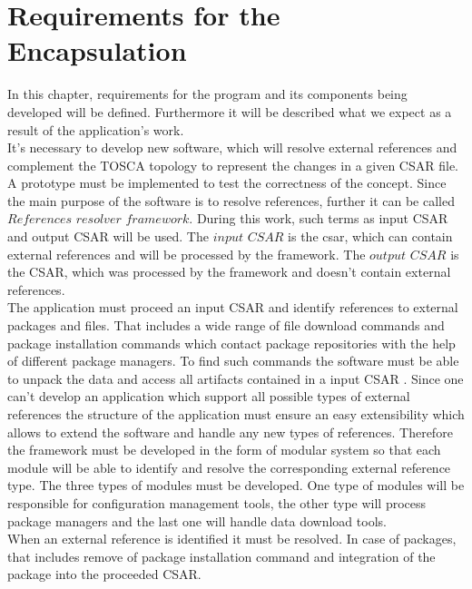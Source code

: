
\chapter{Requirements for the Encapsulation}\label{chap:req}
In this chapter, requirements for the program and its components being developed will be defined.
Furthermore it will be described what we expect as a result of the application's work.\\
It's necessary to develop new software, which will resolve external references and complement the TOSCA topology to represent the changes in a given CSAR file.
A prototype must be implemented to test the correctness of the concept.
Since the main purpose of the software is to resolve references, further it can be called $References$ $resolver$ $framework$.  
During this work, such terms as input CSAR and output CSAR will be used.
The $input$ $CSAR$ is the \gls{csar}, which can contain external references and will be processed by the framework. %
The $output$ $CSAR$ is the CSAR, which was processed by the framework and doesn't contain external references. \\%
The application must proceed an input CSAR and identify references to external packages and files.
That includes a wide range of file download commands and package installation commands which contact package repositories with the help of different package managers.
To find such commands the software must be able to unpack the data and access all artifacts contained in a input CSAR .
Since one can't develop an application which support all possible types of external references the structure of the application must ensure an easy extensibility which allows to extend the software and handle any new types of references.
Therefore the framework must be developed in the form of modular system so that each module will be able to identify and resolve the corresponding external reference type.
The three types of modules must be developed.
One type of modules will be responsible for configuration management tools, the other type will process package managers and the last one will handle data download tools.\\
When an external reference is identified it must be resolved. 
In case of packages, that includes remove of package installation command and integration of the package into the proceeded CSAR.
